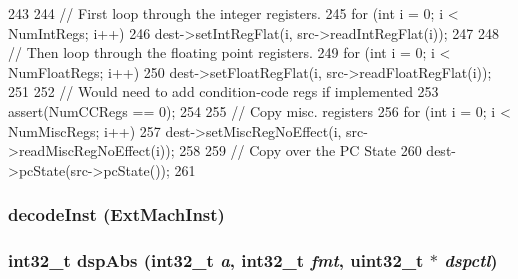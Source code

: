 \begin{DoxyCode}
243 {
244     // First loop through the integer registers.
245     for (int i = 0; i < NumIntRegs; i++)
246         dest->setIntRegFlat(i, src->readIntRegFlat(i));
247 
248     // Then loop through the floating point registers.
249     for (int i = 0; i < NumFloatRegs; i++)
250         dest->setFloatRegFlat(i, src->readFloatRegFlat(i));
251 
252     // Would need to add condition-code regs if implemented
253     assert(NumCCRegs == 0);
254 
255     // Copy misc. registers
256     for (int i = 0; i < NumMiscRegs; i++)
257         dest->setMiscRegNoEffect(i, src->readMiscRegNoEffect(i));
258 
259     // Copy over the PC State
260     dest->pcState(src->pcState());
261 }
\end{DoxyCode}
\hypertarget{namespaceMipsISA_a294cc8fc1febc2b191de37fe26cccecf}{
\subsubsection[{decodeInst}]{ decodeInst (ExtMachInst)}}
\label{namespaceMipsISA_a294cc8fc1febc2b191de37fe26cccecf}
\hypertarget{namespaceMipsISA_a31dde0cc194f6c034d86c7c15efeb4c0}{
\subsubsection[{dspAbs}]{\setlength{\rightskip}{0pt plus 5cm}int32\_\-t dspAbs (int32\_\-t {\em a}, \/  int32\_\-t {\em fmt}, \/  {\bf uint32\_\-t} $\ast$ {\em dspctl})}}
\label{namespaceMipsISA_a31dde0cc194f6c034d86c7c15efeb4c0}



